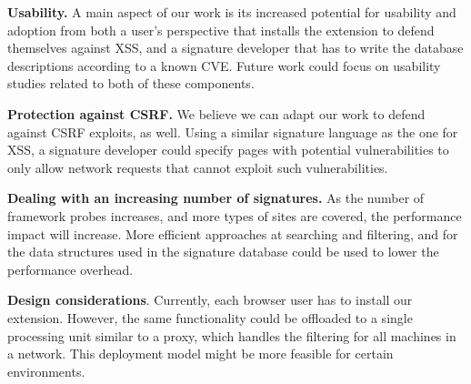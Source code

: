 \textbf{Usability.} A main aspect of our work is its increased potential for usability and adoption from both a user's perspective that installs the extension to defend themselves against \ac{XSS}, and a signature developer that has to write the database descriptions according to a known CVE. Future work could focus on usability studies related to both of these components.

\textbf{Protection against CSRF.} We believe we can adapt our work to defend against \ac{CSRF} exploits, as well. Using a similar signature language as the one for \ac{XSS}, a signature developer could specify pages with potential vulnerabilities to only allow network requests that cannot exploit such vulnerabilities.


\textbf{Dealing with an increasing number of signatures.} As the number of framework probes increases, and more types of sites are covered, the performance impact will increase. More efficient approaches at searching and filtering, and for the data structures used in the signature database could be used to lower the performance overhead.


\textbf{Design considerations}. Currently, each browser user has to install our extension. However, the same functionality could be offloaded to a single processing unit similar to a proxy, which handles the filtering for all machines in a network. This deployment model might be more feasible for certain environments.



